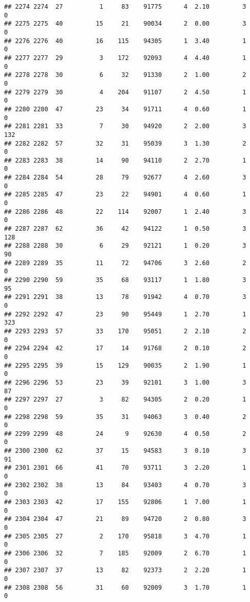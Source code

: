 \documentclass[
]{article}
\begin{document}
\begin{verbatim}
## 2274 2274  27          1     83    91775      4  2.10         3        0
## 2275 2275  40         15     21    90034      2  0.00         3        0
## 2276 2276  40         16    115    94305      1  3.40         1        0
## 2277 2277  29          3    172    92093      4  4.40         1        0
## 2278 2278  30          6     32    91330      2  1.00         2        0
## 2279 2279  30          4    204    91107      2  4.50         1        0
## 2280 2280  47         23     34    91711      4  0.60         1        0
## 2281 2281  33          7     30    94920      2  2.00         3      132
## 2282 2282  57         32     31    95039      3  1.30         2        0
## 2283 2283  38         14     90    94110      2  2.70         1        0
## 2284 2284  54         28     79    92677      4  2.60         3        0
## 2285 2285  47         23     22    94901      4  0.60         1        0
## 2286 2286  48         22    114    92007      1  2.40         3        0
## 2287 2287  62         36     42    94122      1  0.50         3      128
## 2288 2288  30          6     29    92121      1  0.20         3       90
## 2289 2289  35         11     72    94706      3  2.60         2        0
## 2290 2290  59         35     68    93117      1  1.80         3       95
## 2291 2291  38         13     78    91942      4  0.70         3        0
## 2292 2292  47         23     90    95449      1  2.70         1      323
## 2293 2293  57         33    170    95051      2  2.10         2        0
## 2294 2294  42         17     14    91768      2  0.10         2        0
## 2295 2295  39         15    129    90035      2  1.90         1        0
## 2296 2296  53         23     39    92101      3  1.00         3       87
## 2297 2297  27          3     82    94305      2  0.20         1        0
## 2298 2298  59         35     31    94063      3  0.40         2        0
## 2299 2299  48         24      9    92630      4  0.50         2        0
## 2300 2300  62         37     15    94583      3  0.10         3       91
## 2301 2301  66         41     70    93711      3  2.20         1        0
## 2302 2302  38         13     84    93403      4  0.70         3        0
## 2303 2303  42         17    155    92806      1  7.00         1        0
## 2304 2304  47         21     89    94720      2  0.80         3        0
## 2305 2305  27          2    170    95818      3  4.70         1        0
## 2306 2306  32          7    185    92009      2  6.70         1        0
## 2307 2307  37         13     82    92373      2  2.20         1        0
## 2308 2308  56         31     60    92009      3  1.70         1        0

\end{verbatim}
\end{document}
